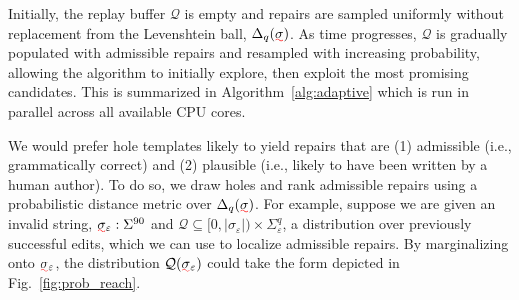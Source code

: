 \documentclass[sigplan,review,anonymous,acmsmall]{acmart}\settopmatter{printfolios=false,printccs=false,printacmref=false}
\begin{document}
\begin{wrapfigure}{r}{0.5\textwidth}
  \vspace{-10pt}
  \scalebox{0.5}{
  \begin{minipage}{\textwidth}
  
  \end{minipage}
  }
\end{wrapfigure}

Initially, the replay buffer $\mathcal{Q}$ is empty and repairs are sampled uniformly without replacement from the Levenshtein ball, $\Delta_{q}(\err{\sigma})$. As time progresses, $\mathcal{Q}$  is gradually populated with admissible repairs and resampled with increasing probability, allowing the algorithm to initially explore, then exploit the most promising candidates. This is summarized in Algorithm~\ref{alg:adaptive} which is run in parallel across all available CPU cores.

We would prefer hole templates likely to yield repairs that are (1) admissible (i.e., grammatically correct) and (2) plausible (i.e., likely to have been written by a human author). To do so, we draw holes and rank admissible repairs using a probabilistic distance metric over $\Delta_q(\err{\sigma})$. For example, suppose we are given an invalid string, $\err{\sigma}_{\varepsilon}: \Sigma^{90}$ and $\mathcal{Q} \subseteq [0, |\sigma_\varepsilon|) \times \Sigma^q_\varepsilon$, a distribution over previously successful edits, which we can use to localize admissible repairs. By marginalizing onto $\err{\sigma}_\varepsilon$, the distribution $\mathcal{Q}(\err{\sigma}_\varepsilon)$ could take the form depicted in Fig.~\ref{fig:prob_reach}.

%
%
\end{document}
